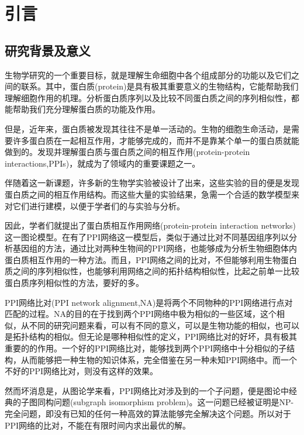 \chapter{引言}
\section{研究背景及意义}
生物学研究的一个重要目标，就是理解生命细胞中各个组成部分的功能以及它们之间的联系。其中，蛋白质(protein)是具有极其重要意义的生物结构，它能帮助我们理解细胞作用的机理。分析蛋白质序列以及比较不同蛋白质之间的序列相似性，都能帮助我们充分理解蛋白质的功能及作用。

但是，近年来，蛋白质被发现其往往不是单一活动的。生物的细胞生命活动，是需要许多蛋白质在一起相互作用，才能够完成的，而并不是靠某个单一的蛋白质就能做到的。发现并理解蛋白质与蛋白质之间的相互作用(protein-protein interactions,PPIs)，就成为了领域内的重要课题之一。

伴随着这一新课题，许多新的生物学实验\cite{uetz2000comprehensive,ito2001comprehensive,krogan2006global,han2004evidence,nabieva2005whole,yook2004functional}被设计了出来，这些实验的目的便是发现蛋白质之间的相互作用结构。而这些大量的实验结果，急需一个合适的数学模型来对它们进行建模，以便于学者们的与实验与分析。

因此，学者们就提出了蛋白质相互作用网络(protein-protein interaction networks)这一图论模型。在有了PPI网络这一模型后，类似于通过比对不同基因组序列以分析基因组的方法，通过比对两种生物间的PPI网络，也能够成为分析生物细胞体内蛋白质相互作用的一种方法。而且，PPI网络之间的比对，不但能够利用生物蛋白质之间的序列相似性，也能够利用网络之间的拓扑结构相似性，比起之前单一比较蛋白质序列相似性的方法，要好的多。

PPI网络比对(PPI network alignment,NA)是将两个不同物种的PPI网络进行点对匹配的过程。NA的目的在于找到两个PPI网络中极为相似的一些区域，这个相似，从不同的研究问题来看，可以有不同的意义，可以是生物功能的相似，也可以是拓扑结构的相似。但无论是哪种相似性的定义，PPI网络比对的好坏，具有极其重要的的作用。一个好的PPI网络比对，能够找到两个PPI网络中十分相似的子结构，从而能够把一种生物的知识体系，完全借鉴在另一种未知PPI网络中。而一个不好的PPI网络比对，则没有这样的效果。

然而坏消息是，从图论学来看，PPI网络比对涉及到的一个子问题，便是图论中经典的子图同构问题(subgraph isomorphism problem)。这一问题已经被证明是NP-完全问题，即没有已知的任何一种高效的算法能够完全解决这个问题。所以对于PPI网络的比对，不能在有限时间内求出最优的解。

